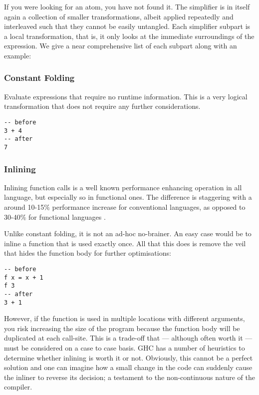 If you were looking for an atom, you have not found it. The simplifier is in itself again a collection of smaller transformations,
albeit applied repeatedly and interleaved such that they cannot be easily untangled. Each simplifier subpart is a local transformation,
that is, it only looks at the immediate surroundings of the expression. We give a near comprehensive list of each subpart along with an example: 
\cite{ghc_wiki_core2core}

\subsubsection{Constant Folding}
Evaluate expressions that require no runtime information. This is a very logical transformation that does not
require any further considerations.

\begin{listing}[H]
\begin{verbatim}
-- before
3 + 4
-- after
7
\end{verbatim}
\end{listing}

\subsubsection{Inlining}
\label{section:background:inlining}

Inlining function calls is a well known performance enhancing operation in all language, but especially so in functional ones.
The difference is staggering with a around 10-15\% performance increase for conventional languages, as opposed to
30-40\% for functional languages \cite{haskell_optimisations_1997}.

Unlike constant folding, it is not an ad-hoc no-brainer. An easy case would be to inline a function that is
used exactly once. All that this does is remove the veil that hides the function body for further optimisations:

\begin{listing}[H]
\begin{verbatim}
-- before
f x = x + 1
f 3
-- after
3 + 1
\end{verbatim}
\end{listing}

However, if the function is used in multiple locations with different arguments, you risk increasing the size of the program
because the function body will be duplicated at each call-site. This is a trade-off that --- although often worth it --- must be
considered on a case to case basis. GHC has a number of heuristics to determine whether inlining is worth it or not. \cite{secrets_of_the_inliner}
Obviously, this cannot be a perfect solution and one can imagine how a small change in the code can suddenly cause the inliner to reverse
its decision; a testament to the non-continuous nature of the compiler.

